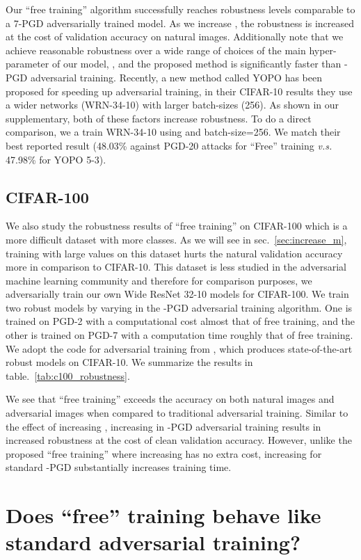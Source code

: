 \documentclass{article}
\begin{document}
Our ``free training'' algorithm successfully reaches robustness levels comparable to a 7-PGD adversarially trained model. As we increase , the robustness is increased at the cost of validation accuracy on natural images. Additionally note that we achieve reasonable robustness over a wide range of choices of the main hyper-parameter of our model, , and the proposed method is significantly faster than -PGD adversarial training. Recently, a new method called YOPO \citep{zhang2019you} has been proposed for speeding up adversarial training, in their CIFAR-10 results they use a wider networks (WRN-34-10) with larger batch-sizes (256). As shown in our supplementary, both of these factors increase robustness. To do a direct comparison, we a train WRN-34-10 using  and batch-size=256.  We match their best reported result (48.03\% against PGD-20 attacks for ``Free'' training  \textit{v.s.} 47.98\% for YOPO 5-3).

\subsection*{CIFAR-100}
We also study the robustness results of ``free training'' on CIFAR-100 which is a more difficult dataset with more classes. As we will see in sec.~\ref{sec:increase_m}, training with large  values on this dataset hurts the natural validation accuracy more in comparison to CIFAR-10. This dataset is less studied in the adversarial machine learning community and therefore for comparison purposes, we adversarially train our own Wide ResNet 32-10 models for CIFAR-100. We train two robust models by varying  in the -PGD adversarial training algorithm. One is trained on PGD-2 with a computational cost almost  that of free training, and the other is trained on PGD-7 with a computation time roughly  that of free training. We adopt the code for adversarial training from \cite{madry2017towards}, which produces state-of-the-art robust models on CIFAR-10. We summarize the results in table.~\ref{tab:c100_robustness}. 


We see that ``free training'' exceeds the accuracy on both natural images and adversarial images when compared to traditional adversarial training. Similar to the effect of increasing , increasing  in -PGD adversarial training results in increased robustness at the cost of clean validation accuracy. However, unlike the proposed ``free training'' where increasing  has no extra cost, increasing  for standard -PGD substantially increases training time.

\section{Does ``free'' training behave like standard adversarial training?}
\end{document}

